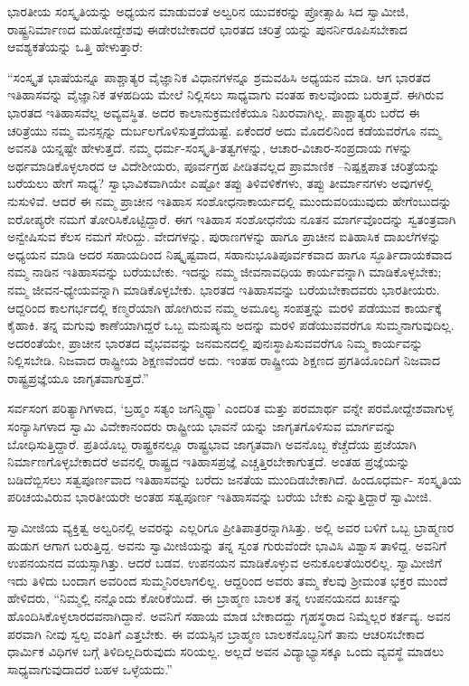 ಭಾರತೀಯ ಸಂಸ್ಕೃತಿಯನ್ನು ಅಧ್ಯಯನ ಮಾಡುವಂತೆ ಅಲ್ವರಿನ ಯುವಕರನ್ನು ಪ್ರೋತ್ಸಾಹಿ ಸಿದ ಸ್ವಾಮೀಜಿ, ರಾಷ್ಟ್ರನಿರ್ಮಾಣದ ಮಹೋದ್ದೇಶವು ಈಡೇರಬೇಕಾದರೆ ಭಾರತದ ಚರಿತ್ರೆ ಯನ್ನು ಪುನರ್ನಿರೂಪಿಸಬೇಕಾದ ಆವಶ್ಯಕತೆಯನ್ನು ಒತ್ತಿ ಹೇಳುತ್ತಾರೆ:

“ಸಂಸ್ಕೃತ ಭಾಷೆಯನ್ನೂ ಪಾಶ್ಚಾತ್ಯರ ವೈಜ್ಞಾನಿಕ ವಿಧಾನಗಳನ್ನೂ ಶ್ರಮವಹಿಸಿ ಅಧ್ಯಯನ ಮಾಡಿ. ಆಗ ಭಾರತದ ಇತಿಹಾಸವನ್ನು ವೈಜ್ಞಾನಿಕ ತಳಹದಿಯ ಮೇಲೆ ನಿಲ್ಲಿಸಲು ಸಾಧ್ಯವಾಗು ವಂತಹ ಕಾಲವೊಂದು ಬರುತ್ತದೆ. ಈಗಿರುವ ಭಾರತದ ಇತಿಹಾಸವೆಲ್ಲ ಅವ್ಯವಸ್ಥಿತ. ಅದರ ಕಾಲಾನುಕ್ರಮಣಿಕೆಯೂ ನಿಖರವಾಗಿಲ್ಲ. ಪಾಶ್ಚಾತ್ಯರು ಬರೆದ ಈ ಚರಿತ್ರೆಯು ನಮ್ಮ ಮನಸ್ಸನ್ನು ದುರ್ಬಲಗೊಳಿಸುತ್ತದೆಯಷ್ಟೆ. ಏಕೆಂದರೆ ಅದು ಮೊದಲಿನಿಂದ ಕಡೆಯವರೆಗೂ ನಮ್ಮ ಅವನತಿ ಯನ್ನಷ್ಟೇ ಹೇಳುತ್ತದೆ. ನಮ್ಮ ಧರ್ಮ-ಸಂಸ್ಕೃತಿ-ತತ್ವಗಳನ್ನು, ಆಚಾರ-ವಿಚಾರ-ಸಂಪ್ರದಾಯ ಗಳನ್ನು ಅರ್ಥಮಾಡಿಕೊಳ್ಳಲಾರದ ಆ ವಿದೇಶೀಯರು, ಪೂರ್ವಗ್ರಹ ಪೀಡಿತವಲ್ಲದ ಪ್ರಾಮಾಣಿಕ –ನಿಷ್ಪಕ್ಷಪಾತ ಚರಿತ್ರೆಯನ್ನು ಬರೆಯಲು ಹೇಗೆ ಸಾಧ್ಯ? ಸ್ವಾಭಾವಿಕವಾಗಿಯೇ ಎಷ್ಟೋ ತಪ್ಪು ತಿಳಿವಳಿಕೆಗಳು, ತಪ್ಪು ತೀರ್ಮಾನಗಳು ಅವುಗಳಲ್ಲಿ ನುಸುಳಿವೆ. ಆದರೆ ಈ ನಮ್ಮ ಪ್ರಾಚೀನ ಇತಿಹಾಸ ಸಂಶೋಧನಾಕಾರ್ಯದಲ್ಲಿ ಮುಂದುವರಿಯುವುದು ಹೇಗೆಂಬುದನ್ನು ಐರೋಪ್ಯರೇ ನಮಗೆ ತೋರಿಸಿಕೊಟ್ಟಿದ್ದಾರೆ. ಈಗ ಇತಿಹಾಸ ಸಂಶೋಧನೆಯ ನೂತನ ಮಾರ್ಗವೊಂದನ್ನು ಸ್ವತಂತ್ರವಾಗಿ ಅನ್ವೇಷಿಸುವ ಕೆಲಸ ನಮಗೆ ಸೇರಿದ್ದು. ವೇದಗಳನ್ನು, ಪುರಾಣಗಳನ್ನು ಹಾಗೂ ಪ್ರಾಚೀನ ಐತಿಹಾಸಿಕ ದಾಖಲೆಗಳನ್ನು ಅಧ್ಯಯನ ಮಾಡಿ ಅದರ ಸಹಾಯದಿಂದ ನಿಷ್ಕೃಷ್ಟವಾದ, ಸಹಾನುಭೂತಿಪೂರ್ವಕವಾದ ಹಾಗೂ ಸ್ಫೂರ್ತಿದಾಯಕವಾದ ನಮ್ಮ ನಾಡಿನ ಇತಿಹಾಸವನ್ನು ಬರೆಯಬೇಕು. ಇದನ್ನು ನಮ್ಮ ಜೀವನಾವಧಿಯ ಕಾರ್ಯವನ್ನಾಗಿ ಮಾಡಿಕೊಳ್ಳಬೇಕು; ನಮ್ಮ ಜೀವನ-ಧ್ಯೇಯವನ್ನಾಗಿ ಮಾಡಿಕೊಳ್ಳಬೇಕು. ಭಾರತದ ಇತಿಹಾಸವನ್ನು ಬರೆಯಬೇಕಾದವರು ಭಾರತೀಯರು. ಆದ್ದರಿಂದ ಕಾಲಗರ್ಭದಲ್ಲಿ ಕಣ್ಮರೆಯಾಗಿ ಹೋಗಿರುವ ನಮ್ಮ ಅಮೂಲ್ಯ ಸಂಪತ್ತನ್ನು ಮರಳಿ ಪಡೆಯುವ ಕಾರ್ಯಕ್ಕೆ ಕೈಹಾಕಿ. ತನ್ನ ಮಗುವು ಕಾಣೆಯಾಗಿದ್ದರೆ ಒಬ್ಬ ಮನುಷ್ಯನು ಅದನ್ನು ಮರಳಿ ಪಡೆಯುವವರೆಗೂ ಸುಮ್ಮನಾಗುವುದಿಲ್ಲ. ಅದರಂತೆಯೇ, ಪ್ರಾಚೀನ ಭಾರತದ ವೈಭವವನ್ನು ಜನಮನದಲ್ಲಿ ಪುನಃಸ್ಥಾಪಿಸುವವರೆಗೂ ನಿಮ್ಮ ಕಾರ್ಯವನ್ನು ನಿಲ್ಲಿಸಬೇಡಿ. ನಿಜವಾದ ರಾಷ್ಟ್ರೀಯ ಶಿಕ್ಷಣವೆಂದರೆ ಅದು. ಇಂತಹ ರಾಷ್ಟ್ರೀಯ ಶಿಕ್ಷಣದ ಪ್ರಗತಿಯೊಂದಿಗೆ ನಿಜವಾದ ರಾಷ್ಟ್ರಪ್ರಜ್ಞೆಯೂ ಜಾಗೃತವಾಗುತ್ತದೆ.”

ಸರ್ವಸಂಗ ಪರಿತ್ಯಾಗಿಗಳಾದ, ‘ಬ್ರಹ್ಮಂ ಸತ್ಯಂ ಜಗನ್ಮಿಥ್ಯಾ’ ಎಂದರಿತ ಮತ್ತು ಪರಮಾರ್ಥ ವನ್ನೇ ಪರಮೋದ್ದೇಶವಾಗುಳ್ಳ ಸಂನ್ಯಾಸಿಗಳಾದ ಸ್ವಾಮಿ ವಿವೇಕಾನಂದರು ರಾಷ್ಟ್ರೀಯ ಭಾವನೆ ಯನ್ನು ಜಾಗೃತಗೊಳಿಸುವ ಮಾರ್ಗವನ್ನು ಬೋಧಿಸುತ್ತಿದ್ದಾರೆ. ಪ್ರತಿಯೊಬ್ಬ ರಾಷ್ಟ್ರಕನಲ್ಲೂ ರಾಷ್ಟ್ರಭಾವ ಜಾಗೃತವಾಗಿ ಅವನೊಬ್ಬ ಕೆಚ್ಚೆದೆಯ ಪ್ರಜೆಯಾಗಿ ನಿರ್ಮಾಣಗೊಳ್ಳಬೇಕಾದರೆ ಅವನಲ್ಲಿ ರಾಷ್ಟ್ರದ ಇತಿಹಾಸಪ್ರಜ್ಞೆ ಎಚ್ಚತ್ತಿರಬೇಕಾಗುತ್ತದೆ. ಅಂತಹ ಪ್ರಜ್ಞೆಯನ್ನು ಬಡಿದೆಬ್ಬಿಸಲು ಸತ್ವಪೂರ್ಣವಾದ ಇತಿಹಾಸವನ್ನು ಬರೆದು ಜನತೆಯ ಮುಂದಿಡಬೇಕಾಗಿದೆ. ಹಿಂದೂಧರ್ಮ- ಸಂಸ್ಕೃತಿಯ ಪರಿಚಯವಿರುವ ಭಾರತೀಯರೇ ಅಂತಹ ಸತ್ವಪೂರ್ಣ ಇತಿಹಾಸವನ್ನು ಬರೆಯ ಬೇಕು ಎನ್ನುತ್ತಿದ್ದಾರೆ ಸ್ವಾಮೀಜಿ.

ಸ್ವಾಮೀಜಿಯ ವ್ಯಕ್ತಿತ್ವ ಅಲ್ವರಿನಲ್ಲಿ ಅವರನ್ನು ಎಲ್ಲರಿಗೂ ಪ್ರೀತಿಪಾತ್ರರನ್ನಾಗಿಸಿತ್ತು. ಅಲ್ಲಿ ಅವರ ಬಳಿಗೆ ಒಬ್ಬ ಬ್ರಾಹ್ಮಣರ ಹುಡುಗ ಆಗಾಗ ಬರುತ್ತಿದ್ದ. ಅವನು ಸ್ವಾಮೀಜಿಯನ್ನು ತನ್ನ ಸ್ವಂತ ಗುರುವೆಂದೇ ಭಾವಿಸಿ ವಿಶ್ವಾಸ ತಾಳಿದ್ದ. ಅವನಿಗೆ ಉಪನಯನದ ವಯಸ್ಸಾಗಿತ್ತು. ಆದರೆ ಬಡವ. ಉಪನಯನ ಮಾಡಿಕೊಳ್ಳುವ ಅನುಕೂಲತೆಯಿರಲಿಲ್ಲ. ಸ್ವಾಮೀಜಿಗೆ ಇದು ತಿಳಿದು ಬಂದಾಗ ಅವರಿಂದ ಸುಮ್ಮನಿರಲಾಗಲಿಲ್ಲ. ಆದ್ದರಿಂದ ಅವರು ತಮ್ಮ ಕೆಲವು ಶ್ರೀಮಂತ ಭಕ್ತರ ಮುಂದೆ ಹೇಳಿದರು, “ನಿಮ್ಮಲ್ಲಿ ನನ್ನೊಂದು ಕೋರಿಕೆಯಿದೆ. ಈ ಬ್ರಾಹ್ಮಣ ಬಾಲಕ ತನ್ನ ಉಪನಯನದ ಖರ್ಚನ್ನು ಹೊಂದಿಸಿಕೊಳ್ಳಲಾರದವನಾಗಿದ್ದಾನೆ. ಅವನಿಗೆ ಸಹಾಯ ಮಾಡ ಬೇಕಾದದ್ದು ಗೃಹಸ್ಥರಾದ ನಿಮ್ಮೆಲ್ಲರ ಕರ್ತವ್ಯ. ಅವನ ಪರವಾಗಿ ನೀವು ಸ್ವಲ್ಪ ವಂತಿಗೆ ಎತ್ತಬೇಕು. ಈ ವಯಸ್ಸಿನ ಬ್ರಾಹ್ಮಣ ಬಾಲಕನೊಬ್ಬನಿಗೆ ತಾನು ಆಚರಿಸಬೇಕಾದ ಧಾರ್ಮಿಕ ವಿಧಿಗಳ ಬಗ್ಗೆ ತಿಳಿದಿಲ್ಲದಿರುವುದು ಸರಿಯಲ್ಲ. ಅಲ್ಲದೆ ಅವನ ವಿದ್ಯಾಭ್ಯಾಸಕ್ಕೂ ಒಂದು ವ್ಯವಸ್ಥೆ ಮಾಡಲು ಸಾಧ್ಯವಾಗುವುದಾದರೆ ಬಹಳ ಒಳ್ಳೆಯದು.”

